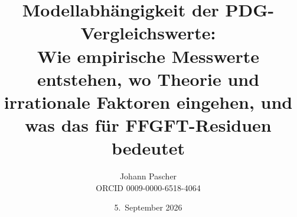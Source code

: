 \documentclass[11pt,a4paper]{report}
\title{Modellabhängigkeit der PDG-Vergleichswerte:\\[0.5em]
  \large Wie empirische Messwerte entstehen, wo Theorie und irrationale Faktoren eingehen, und was das für FFGFT-Residuen bedeutet}
\date{5.~September 2026}
\author{Johann Pascher\\\small ORCID 0009-0000-6518-4064}
\begin{document}
\renewcommand{\thechapter}{}
\renewcommand{\thesection}{\arabic{section}}
\maketitle
\tableofcontents

\end{document}
